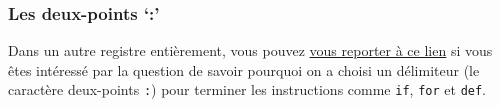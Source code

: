     \hypertarget{les-deux-points}{%
\subsubsection{Les deux-points `:'}\label{les-deux-points}}

    Dans un autre registre entièrement, vous pouvez
\href{https://docs.python.org/3/faq/design.html\#why-are-colons-required-for-the-if-while-def-class-statements}{vous
reporter à ce lien} si vous êtes intéressé par la question de savoir
pourquoi on a choisi un délimiteur (le caractère deux-points \texttt{:})
pour terminer les instructions comme \texttt{if}, \texttt{for} et
\texttt{def}.


    
    
    

